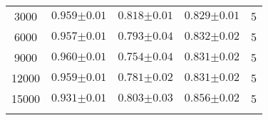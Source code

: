 \begin{table}[H]
\begin{subtable}{\textwidth}
\begin{tabularx}{\textwidth}{cYYYY}
3000 & $0.959{\scriptscriptstyle\pm0.01}$ & $0.818{\scriptscriptstyle\pm0.01}$ & $0.829{\scriptscriptstyle\pm0.01}$ & 5 \\
6000 & $0.957{\scriptscriptstyle\pm0.01}$ & $0.793{\scriptscriptstyle\pm0.04}$ & $0.832{\scriptscriptstyle\pm0.02}$ & 5 \\
9000 & $0.960{\scriptscriptstyle\pm0.01}$ & $0.754{\scriptscriptstyle\pm0.04}$ & $0.831{\scriptscriptstyle\pm0.02}$ & 5 \\
12000 & $0.959{\scriptscriptstyle\pm0.01}$ & $0.781{\scriptscriptstyle\pm0.02}$ & $0.831{\scriptscriptstyle\pm0.02}$ & 5 \\
15000 & $0.931{\scriptscriptstyle\pm0.01}$ & $0.803{\scriptscriptstyle\pm0.03}$ & $0.856{\scriptscriptstyle\pm0.02}$ & 5 \\
         \\
    \end{tabularx}
    \end{subtable}
\end{table}
